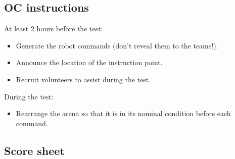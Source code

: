 \subsection*{OC instructions}

At least 2 hours before the test:
\begin{itemize}
	\item Generate the robot commands (don't reveal them to the teams!).
	\item Announce the location of the instruction point.
	\item Recruit volunteers to assist during the test.
\end{itemize}

\noindent During the test:
\begin{itemize}[nosep]
	\item Rearrange the arena so that it is in its nominal condition before each command.
\end{itemize}

\subsection*{Score sheet}


